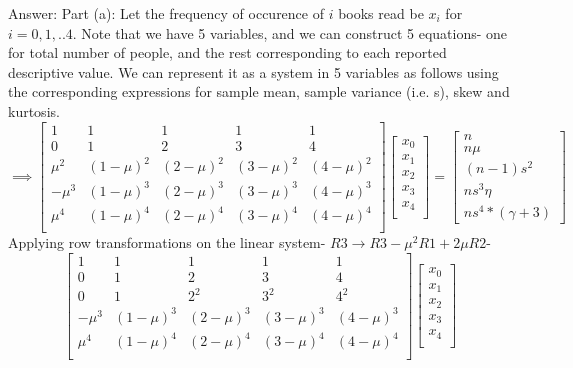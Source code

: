 \documentclass[12pt, oneside]{article}
\begin{document}
\begin{enumerate}
Answer:
\newline Part (a): Let the frequency of occurence of $i$ books read be $x_i$ for $i=0,1,..4$. Note that we have 5 variables, and we can construct 5 equations- one for total number of people, and the rest corresponding to each reported descriptive value. We can represent it as a system in 5 variables as follows using the corresponding expressions for sample mean, sample variance (i.e. s), skew and kurtosis.
\[ 
\implies 
\begin{bmatrix}
1 & 1 & 1 & 1 & 1 \\
0 & 1 & 2 & 3 & 4 \\
\mu^2 & (1-\mu)^2 & (2-\mu)^2 & (3-\mu)^2 & (4-\mu)^2 \\
-\mu^3 & (1-\mu)^3 & (2-\mu)^3 & (3-\mu)^3 & (4-\mu)^3 \\
\mu^4 & (1-\mu)^4 & (2-\mu)^4 & (3-\mu)^4 & (4-\mu)^4 \\
\end{bmatrix}
\begin{bmatrix}
x_0 \\
x_1 \\
x_2 \\
x_3 \\
x_4 \\
\end{bmatrix}
= \begin{bmatrix}
n \\
n\mu \\
(n-1)s^2 \\
ns^3 \eta \\
ns^4*(\gamma+3)
\end{bmatrix}
\]
Applying row transformations on the linear system- $R3 \to R3 - \mu^2 R1 + 2\mu R2$-
\[
\begin{bmatrix}
1 & 1 & 1 & 1 & 1 \\
0 & 1 & 2 & 3 & 4 \\
0 & 1 & 2^2 & 3^2 & 4^2 \\
-\mu^3 & (1-\mu)^3 & (2-\mu)^3 & (3-\mu)^3 & (4-\mu)^3 \\
\mu^4 & (1-\mu)^4 & (2-\mu)^4 & (3-\mu)^4 & (4-\mu)^4 \\
\end{bmatrix}
\begin{bmatrix}
x_0 \\
x_1 \\
x_2 \\
x_3 \\
x_4 \\

\end{bmatrix}\]
\end{enumerate}
\end{document}
